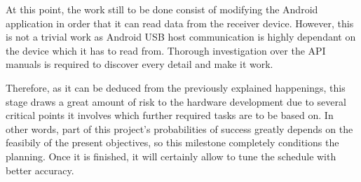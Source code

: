 \begin{enumerate}
				\begin{comment}
				That great news helps the android development team, than in this moment becomes the full team, 
				to succesfully imlements the android USB host communication in our aplication in just a weekend. 
				Android USB host comunication was higly dependant of what device was in the other side of the 
				communication, thus everybody was needed in this hard and delicated part of the develop to 
				investigate the high cuantity of manuals contained in the API in orther to find and implement 
				all this particularities. Finally we luckily discover that now, our android and MSP430 can 
				also comunicate each other trought our aplication. \\
				\end{comment}
				At this point, the work still to be done consist of modifying the Android application in order
				that it can read data from the receiver device. However, this is not a trivial work as Android
				USB host communication is highly dependant on the device which it has to read from. Thorough
				investigation over the API manuals is required to discover every detail and make it work.
		\end{enumerate}

		\begin{comment}
		That was wtih no doubts the harder and more dangerous part of the research, there was a lot of 
		chances to do not achieve our goal and the hard work of all the team was essential. This milestone 
		suppose a very important fact not only in hardware part but in all the project because now, we can 
		more accurately schedule all of the project. \\
		\end{comment}
		Therefore, as it can be deduced from the previously explained happenings, this stage draws a great amount 
		of risk to the hardware development due to several critical points it involves which further required
		tasks are to be based on. In other words, part of this project's probabilities of success greatly depends
		on the feasibily of the present objectives, so this milestone completely conditions the planning. Once 
		it is finished, it will certainly allow to tune the schedule with better accuracy.

